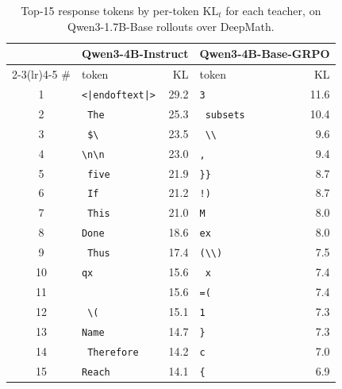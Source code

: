 \begin{table}
\centering
\vspace{-12pt}
\small
\setlength{\tabcolsep}{5pt}
\caption{Top-15 response tokens by per-token $\mathrm{KL}_t$ for each teacher, on Qwen3-1.7B-Base rollouts over DeepMath.}
\vspace{-8pt}
\label{tab:opd-top15}
\begin{tabular}{c l r l r}
\toprule
& \multicolumn{2}{c}{Qwen3-4B-Instruct} & \multicolumn{2}{c}{Qwen3-4B-Base-GRPO} \\
\cmidrule(lr){2-3}\cmidrule(lr){4-5}
\# & token & KL & token & KL \\
\midrule
1  & \texttt{<|endoftext|>}        & 29.2 & \texttt{3}        & 11.6 \\
2  & \texttt{ The}                 & 25.3 & \texttt{ subsets} & 10.4 \\
3  & \texttt{ \$\textbackslash}    & 23.5 & \texttt{ \textbackslash\textbackslash} & 9.6 \\
4  & \texttt{\textbackslash n\textbackslash n} & 23.0 & \texttt{,} & 9.4 \\
5  & \texttt{ five}                & 21.9 & \texttt{\}\}}     & 8.7 \\
6  & \texttt{ If}                  & 21.2 & \texttt{!)}       & 8.7 \\
7  & \texttt{ This}                & 21.0 & \texttt{M}        & 8.0 \\
8  & \texttt{Done}                 & 18.6 & \texttt{ex}       & 8.0 \\
9  & \texttt{ Thus}                & 17.4 & \texttt{(\textbackslash\textbackslash)} & 7.5 \\
10 & \texttt{qx}                   & 15.6 & \texttt{ x}       & 7.4 \\
11 & \texttt{ \char127}            & 15.6 & \texttt{=(}       & 7.4 \\
12 & \texttt{ \textbackslash(}     & 15.1 & \texttt{1}        & 7.3 \\
13 & \texttt{Name}                 & 14.7 & \texttt{\}}       & 7.3 \\
14 & \texttt{ Therefore}           & 14.2 & \texttt{c}        & 7.0 \\
15 & \texttt{Reach}                & 14.1 & \texttt{\{}       & 6.9 \\
\bottomrule
\end{tabular}
\vspace{-10pt}
\end{table}

